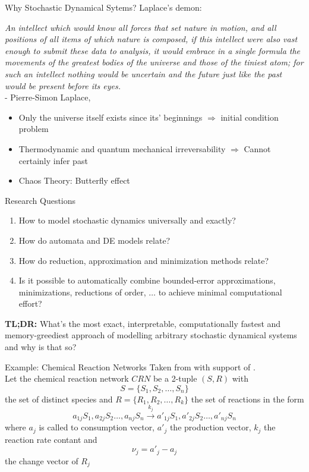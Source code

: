 \documentclass[rgb]{beamer}
\begin{document}
    \begin{frame}{Why \alert{Stochastic} Dynamical Sytems?}
        Laplace's demon:
        \begin{center}
            \textit{An intellect which would know all forces that set nature in motion, and all positions of all items of which nature is composed, if this intellect were also vast enough to submit these data to analysis, it would embrace in a single formula the movements of the greatest bodies of the universe and those of the tiniest atom; for such an intellect nothing would be uncertain and the future just like the past would be present before its eyes.} \\
            - Pierre-Simon Laplace, \autocite{laplace1998pierre}
        \end{center}
        \vfill
        \begin{itemize}
            \item Only the universe itself exists since its' beginnings $\Rightarrow$ initial condition problem
            \item Thermodynamic and quantum mechanical irreversability $\Rightarrow$ Cannot certainly infer past
            \item Chaos Theory: Butterfly effect
        \end{itemize}
    \end{frame}
    
    \begin{frame}{Research Questions}
        \begin{enumerate}
            \item How to model stochastic dynamics universally and exactly?
            \item How do automata and DE models relate? 
            \item How do reduction, approximation and minimization methods relate?
            \item Is it possible to automatically combine bounded-error approximations, minimizations, reductions of order, $\dots$ to achieve minimal computational effort?
        \end{enumerate}
        \vfill
        \textbf{TL;DR:} What's the most exact, interpretable, computationally fastest and memory-greediest approach of modelling arbitrary stochastic dynamical systems and \alert{why} is that so?
    \end{frame}
    
    
    \begin{frame}{Example: Chemical Reaction Networks}
        Taken from \autocite{mc_agg_crn} with support of \autocite{van1992stochastic}. \\
        Let the chemical reaction network $CRN$ be a 2-tuple $(S,R)$ with 
        \[S = \{S_1, S_2, \dots, S_n\}\] the set of distinct species and 
        $R = \{R_1, R_2, \dots, R_k\}$ the set of reactions in the form 
        \[ a_{1j} S_1, a_{2j} S_2 \dots, a_{nj} S_n \xrightarrow{k_j}  a'_{1j} S_1, a'_{2j} S_2 \dots, a'_{nj} S_n \]
        where $a_j$ is called to consumption vector, $a'_j$ the production vector, $k_j$ the reaction rate contant and 
        \[ \nu_j = a'_j - a_j \]
        the change vector of $R_j$
    \end{frame}
  
\end{document}
